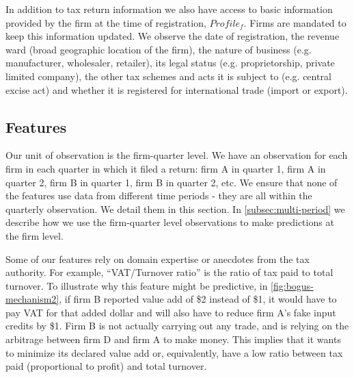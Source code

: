 In addition to tax return information we also have access to basic information provided by the firm at the time of registration, $Profile_f$. Firms are mandated to keep this information updated. We observe the date of registration, the revenue ward (broad geographic location of the firm), the nature of business (e.g. manufacturer, wholesaler, retailer), its legal status (e.g. proprietorship, private limited company), the other tax schemes and acts it is subject to (e.g. central excise act) and whether it is registered for international trade (import or export).

\subsection{Features}
\label{subsec:features}
Our unit of observation is the firm-quarter level. We have an observation for each firm in each quarter in which it filed a return: firm A in quarter 1, firm A in quarter 2, firm B in quarter 1, firm B in quarter 2, etc. We ensure that none of the features use data from different time periods - they are all within the quarterly observation. We detail them in this section. In \cref{subsec:multi-period} we describe how we use the firm-quarter level observations to make predictions at the firm level.

Some of our features rely on domain expertise or anecdotes from the tax authority. For example, ``VAT/Turnover ratio'' is the ratio of tax paid to total turnover. To illustrate why this feature might be predictive, in \cref{fig:bogus-mechanism2}, if firm B reported value add of \$2 instead of \$1, it would have to pay VAT for that added dollar and will also have to reduce firm A's fake input credits by \$1. Firm B is not actually carrying out any trade, and is relying on the arbitrage between firm D and firm A to make money. This implies that it wants to minimize its declared value add or, equivalently, have a low ratio between tax paid (proportional to profit) and total turnover. 

